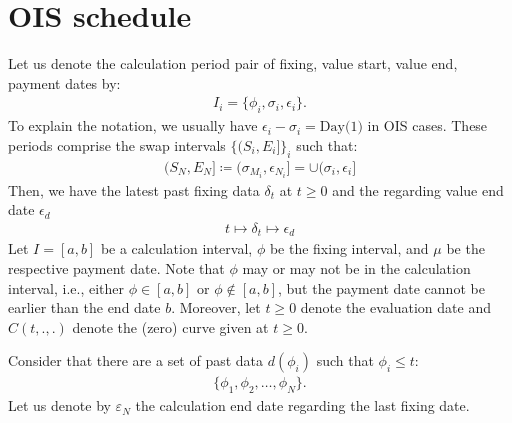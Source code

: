 \documentclass[a4paper, 11pt]{article}              %
\numberwithin{equation}{section}
\theoremstyle{plain}
\newcommand{\1}{\mathds{1}}
\theoremstyle{plain}
\theoremstyle{definition}
\theoremstyle{plain}
\begin{document}
\section{OIS schedule}
\label{sec:ois}
Let us denote the calculation period pair of fixing, value start,
value end, payment dates by:
\begin{align}
  I_i = \{\phi_i, \sigma_i, \epsilon_i\}.
\end{align}
To explain the notation, we usually have $\epsilon_i - \sigma_i = \text{Day(1)}$
in OIS cases. These periods comprise the swap intervals $\{(S_i, E_i]\}_i$ such
that:
\begin{align}
  (S_N, E_N] \coloneqq (\sigma_{M_i}, \epsilon_{N_i}] = \cup(\sigma_i, \epsilon_i]
\end{align}
Then, we have the latest past fixing data $\delta_t$ at $t \geq 0$ and the
regarding value end date $\epsilon_d$
\begin{align}
  t \mapsto \delta_t \mapsto \epsilon_d
\end{align}
Let $I = [a, b]$ be a calculation interval, $\phi$ be the fixing interval, and
$\mu$ be the respective payment date. Note that $\phi$ may or may not be in the
calculation interval, i.e., either $\phi\in [a, b]$ or $\phi\notin [a, b]$, but
the payment date cannot be earlier than the end date $b$.  Moreover, let
$t \geq 0$ denote the evaluation date and $C(t, ., .)$ denote the (zero) curve
given at $t \geq 0$.

Consider that there are a set of past data $d(\phi_i)$ such that $\phi_i \leq t$:
\begin{align}
  \{\phi_1, \phi_2, \dots, \phi_N\}.
\end{align}
Let us denote by $\varepsilon_N$ the calculation end date regarding the last fixing date.
\end{document}
